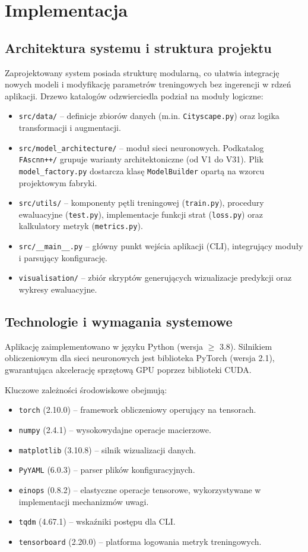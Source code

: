 \chapter{Implementacja}

\section{Architektura systemu i struktura projektu}
Zaprojektowany system posiada strukturę modularną, co ułatwia integrację nowych modeli i modyfikację parametrów treningowych bez ingerencji w rdzeń aplikacji. Drzewo katalogów odzwierciedla podział na moduły logiczne:
\begin{itemize}
    \item \texttt{src/data/} – definicje zbiorów danych (m.in. \texttt{Cityscape.py}) oraz logika transformacji i augmentacji.
    \item \texttt{src/model\_architecture/} – moduł sieci neuronowych. Podkatalog \texttt{FAscnn++/} grupuje warianty architektoniczne (od V1 do V31). Plik \texttt{model\_factory.py} dostarcza klasę \texttt{ModelBuilder} opartą na wzorcu projektowym fabryki.
    \item \texttt{src/utils/} – komponenty pętli treningowej (\texttt{train.py}), procedury ewaluacyjne (\texttt{test.py}), implementacje funkcji strat (\texttt{loss.py}) oraz kalkulatory metryk (\texttt{metrics.py}).
    \item \texttt{src/\_\_main\_\_.py} – główny punkt wejścia aplikacji (CLI), integrujący moduły i parsujący konfigurację.
    \item \texttt{visualisation/} – zbiór skryptów generujących wizualizacje predykcji oraz wykresy ewaluacyjne.
\end{itemize}

\section{Technologie i wymagania systemowe}
Aplikację zaimplementowano w języku Python  (wersja $\ge$ 3.8). Silnikiem obliczeniowym dla sieci neuronowych jest biblioteka PyTorch  (wersja 2.1), gwarantująca akcelerację sprzętową GPU poprzez biblioteki CUDA.

Kluczowe zależności środowiskowe obejmują:
\begin{itemize}
    \item \texttt{torch} (2.10.0) – framework obliczeniowy operujący na tensorach.
    \item \texttt{numpy} (2.4.1) – wysokowydajne operacje macierzowe.
    \item \texttt{matplotlib} (3.10.8) – silnik wizualizacji danych.
    \item \texttt{PyYAML} (6.0.3) – parser plików konfiguracyjnych.
    \item \texttt{einops} (0.8.2) – elastyczne operacje tensorowe, wykorzystywane w implementacji mechanizmów uwagi.
    \item \texttt{tqdm} (4.67.1) – wskaźniki postępu dla CLI.
    \item \texttt{tensorboard} (2.20.0) – platforma logowania metryk treningowych.
\end{itemize}

